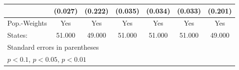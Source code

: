 {\begin{tabular}{l*{6}{c}}
            &     (0.027)         &     (0.222)         &     (0.035)         &     (0.034)         &     (0.033)         &     (0.201)         \\
\hline
Pop.-Weights&         Yes         &         Yes         &         Yes         &         Yes         &         Yes         &         Yes         \\
States:     &      51.000         &      49.000         &      51.000         &      51.000         &      51.000         &      49.000         \\
\hline\hline
\multicolumn{7}{l}{\footnotesize Standard errors in parentheses}\\
\multicolumn{7}{l}{\footnotesize \sym{*} \(p<0.1\), \sym{**} \(p<0.05\), \sym{***} \(p<0.01\)}\\
\end{tabular}
}
